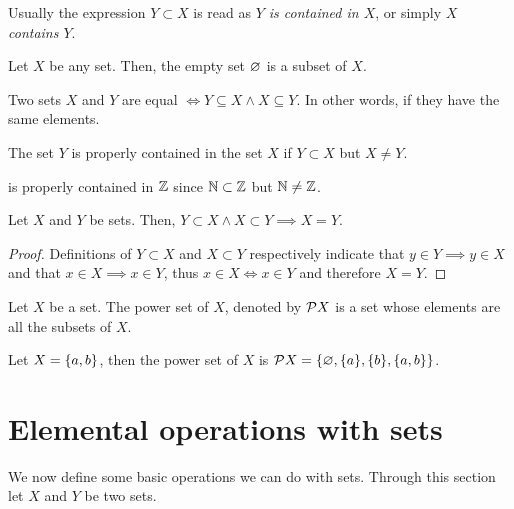 \begin{note}
    Usually the expression $Y\subset X$ is read as \textit{$Y$ is contained in $X$}, or simply \textit{$X$ contains $Y$}.
\end{note}

\begin{prop}
    Let $X$ be any set. Then, the empty set $\O$ is a subset of $X$.
\end{prop}

\begin{defn}
    Two sets $X$ and $Y$ are equal $\iff Y\subseteq X\land X\subseteq Y$. In other words, if they have the same elements.
\end{defn}

\begin{defn}
The set $Y$ is properly contained in the set $X$ if $Y\subset X$ but $X\neq Y$.
\end{defn}

\begin{example}
    \N is properly contained in $\Z$ since $\N\subset\Z$ but $\N\neq\Z$.
\end{example}

\begin{prop}
    Let $X$ and $Y$ be sets. Then, $Y\subset X\land X\subset Y\implies X = Y$.
\end{prop}

\begin{proof}
    Definitions of $Y\subset X$ and $X\subset Y$ respectively indicate that $y\in Y\implies y\in X$ and that $x\in X\implies
    x\in Y$, thus $x\in X\iff x\in Y$ and therefore $X = Y$.
\end{proof}

\begin{defn}
    Let $X$ be a set. The power set of $X$, denoted by $\SP{X}$ is a set whose elements are all the subsets of $X$.
\end{defn}

\begin{example}
    Let $X = \{ a, b \}$, then the power set of $X$ is $\SP{X} = \set{\O, \set{a}, \set{b}, \set{a, b}}$.
\end{example}

\section{Elemental operations with sets}
We now define some basic operations we can do with sets. Through this section let $X$ and $Y$ be two sets.

